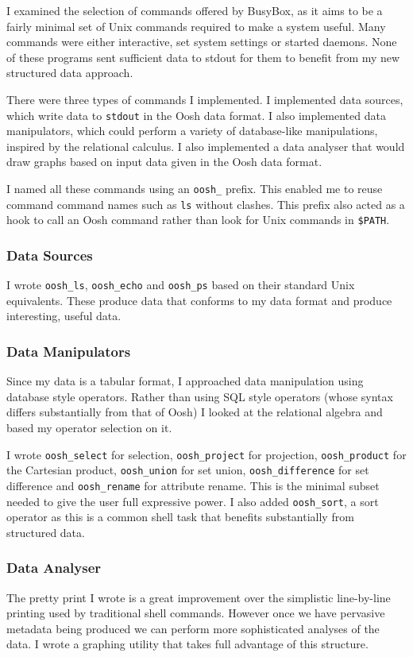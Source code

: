\documentclass[12pt,twoside,notitlepage]{report}
\begin{document}
I examined the selection of commands offered by BusyBox, as it aims to be a
fairly minimal set of Unix commands required to make a system useful. Many
commands were either interactive, set system settings or started daemons. None
of these programs sent sufficient data to stdout for them to benefit from my
new structured data approach.

There were three types of commands I implemented. I implemented data
sources, which write data to {\tt stdout} in the Oosh data format. I
also implemented data manipulators, which could perform a variety of
database-like manipulations, inspired by the relational calculus. I
also implemented a data analyser that would draw graphs based on input
data given in the Oosh data format.

I named all these commands using an {\tt oosh\_} prefix. This enabled me
to reuse command command names such as {\tt ls} without clashes. This
prefix also acted as a hook to call an Oosh command rather than look
for Unix commands in {\tt \$PATH}.


\subsubsection{Data Sources}
I wrote {\tt oosh\_ls}, {\tt oosh\_echo} and {\tt oosh\_ps} based on their
standard Unix equivalents. These produce data that conforms to my data
format and produce interesting, useful data.

\subsubsection{Data Manipulators}
Since my data is a tabular format, I approached data manipulation
using database style operators. Rather than using SQL style operators
(whose syntax differs substantially from that of Oosh) I looked at the
relational algebra and based my operator selection on it.

I wrote {\tt oosh\_select} for selection, {\tt oosh\_project} for
projection, {\tt oosh\_product} for the Cartesian product,
{\tt oosh\_union} for set union, {\tt oosh\_difference} for set difference
and {\tt oosh\_rename} for attribute rename. This is the minimal subset
needed to give the user full expressive power. I also added
{\tt oosh\_sort}, a sort operator as this is a common shell task that
benefits substantially from structured data.

\subsubsection{Data Analyser}
The pretty print I wrote is a great improvement over the simplistic
line-by-line printing used by traditional shell commands. However once
we have pervasive metadata being produced we can perform more
sophisticated analyses of the data. I wrote a graphing utility that
takes full advantage of this structure.
\end{document}
